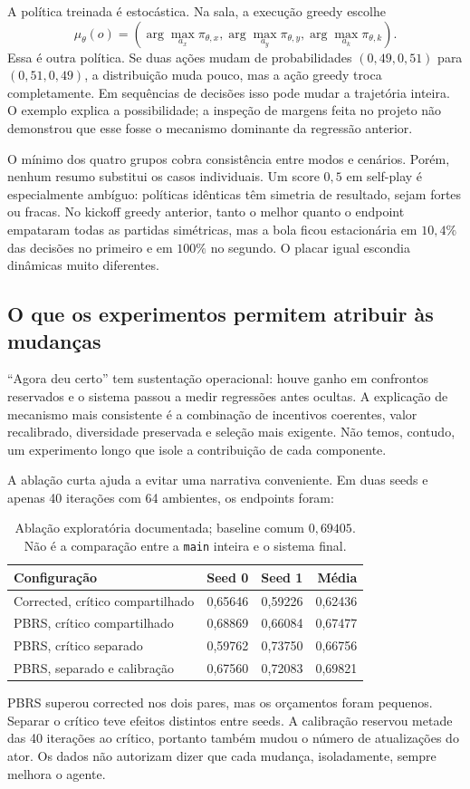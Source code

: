 \documentclass[11pt,a4paper]{article}
\begin{document}
A política treinada é estocástica. Na sala, a execução greedy escolhe
\begin{equation}
 \mu_\theta(o)=\left(\arg\max_{a_x}\pi_{\theta,x},
 \arg\max_{a_y}\pi_{\theta,y},\arg\max_{a_k}\pi_{\theta,k}\right).
\end{equation}
Essa é outra política. Se duas ações mudam de probabilidades $(0{,}49,0{,}51)$ para $(0{,}51,0{,}49)$, a distribuição muda pouco, mas a ação greedy troca completamente. Em sequências de decisões isso pode mudar a trajetória inteira. O exemplo explica a possibilidade; a inspeção de margens feita no projeto não demonstrou que esse fosse o mecanismo dominante da regressão anterior.

O mínimo dos quatro grupos cobra consistência entre modos e cenários. Porém, nenhum resumo substitui os casos individuais. Um score $0{,}5$ em self-play é especialmente ambíguo: políticas idênticas têm simetria de resultado, sejam fortes ou fracas. No kickoff greedy anterior, tanto o melhor quanto o endpoint empataram todas as partidas simétricas, mas a bola ficou estacionária em $10{,}4\%$ das decisões no primeiro e em $100\%$ no segundo. O placar igual escondia dinâmicas muito diferentes.

\subsection{O que os experimentos permitem atribuir às mudanças}
``Agora deu certo'' tem sustentação operacional: houve ganho em confrontos reservados e o sistema passou a medir regressões antes ocultas. A explicação de mecanismo mais consistente é a combinação de incentivos coerentes, valor recalibrado, diversidade preservada e seleção mais exigente. Não temos, contudo, um experimento longo que isole a contribuição de cada componente.

A ablação curta ajuda a evitar uma narrativa conveniente. Em duas seeds e apenas 40 iterações com 64 ambientes, os endpoints foram:
\begin{table}[htbp]\centering\small
\caption{Ablação exploratória documentada; baseline comum $0{,}69405$. Não é a comparação entre a \texttt{main} inteira e o sistema final.}
\begin{tabular}{@{}lrrr@{}}\toprule
Configuração & Seed 0 & Seed 1 & Média\\\midrule
Corrected, crítico compartilhado & 0,65646 & 0,59226 & 0,62436\\
PBRS, crítico compartilhado & 0,68869 & 0,66084 & 0,67477\\
PBRS, crítico separado & 0,59762 & 0,73750 & 0,66756\\
PBRS, separado e calibração & 0,67560 & 0,72083 & 0,69821\\\bottomrule
\end{tabular}
\end{table}
PBRS superou corrected nos dois pares, mas os orçamentos foram pequenos. Separar o crítico teve efeitos distintos entre seeds. A calibração reservou metade das 40 iterações ao crítico, portanto também mudou o número de atualizações do ator. Os dados não autorizam dizer que cada mudança, isoladamente, sempre melhora o agente.
\end{document}

